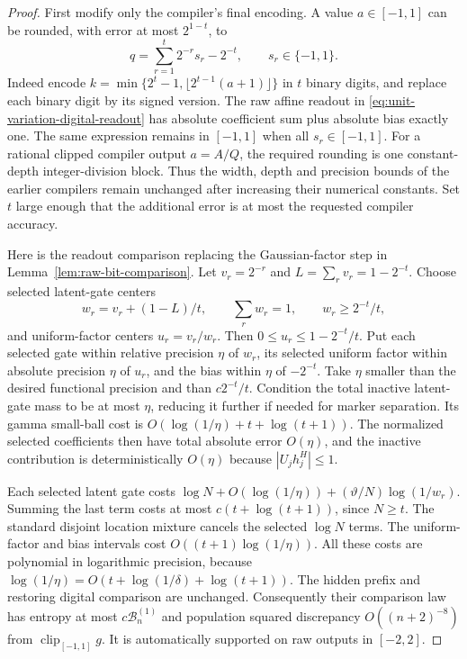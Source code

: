 \begin{proof}
First modify only the compiler's final encoding.  A value $a\in[-1,1]$
can be rounded, with error at most $2^{1-t}$, to
\begin{equation}\label{eq:unit-variation-digital-readout}
 q=\sum_{r=1}^t2^{-r}s_r-2^{-t},\qquad s_r\in\{-1,1\}.
\end{equation}
Indeed encode
$k=\min\{2^t-1,\lfloor2^{t-1}(a+1)\rfloor\}$ in $t$ binary digits,
and replace each binary digit by its signed version.  The raw affine
readout in \eqref{eq:unit-variation-digital-readout} has absolute
coefficient sum plus absolute bias exactly one.  The same expression
remains in $[-1,1]$ when all $s_r\in[-1,1]$.
For a rational clipped compiler output $a=A/Q$, the required rounding is
one constant-depth integer-division block.  Thus the width, depth and
precision bounds of the earlier compilers remain unchanged after
increasing their numerical constants.  Set $t$ large enough that the
additional error is at most the requested compiler accuracy.

Here is the readout comparison replacing the Gaussian-factor step in
Lemma~\ref{lem:raw-bit-comparison}.  Let $v_r=2^{-r}$ and
$L=\sum_rv_r=1-2^{-t}$.  Choose selected latent-gate centers
\[
 w_r=v_r+(1-L)/t,\qquad
 \sum_rw_r=1,\qquad w_r\ge2^{-t}/t,
\]
and uniform-factor centers $u_r=v_r/w_r$.  Then
$0\le u_r\le1-2^{-t}/t$.  Put each selected gate within relative
precision $\eta$ of $w_r$, its selected uniform factor within absolute
precision $\eta$ of $u_r$, and the bias within $\eta$ of $-2^{-t}$.
Take $\eta$ smaller than the desired functional precision and than
$c2^{-t}/t$.  Condition the total inactive latent-gate mass to be at
most $\eta$, reducing it further if needed for marker separation.
Its gamma small-ball cost is $O(\log(1/\eta)+t+\log(t+1))$.
The normalized selected coefficients then have total absolute error
$O(\eta)$, and the inactive contribution is deterministically $O(\eta)$
because $|U_jh_j^H|\le1$.

Each selected latent gate costs $\log N+O(\log(1/\eta))+
(\vartheta/N)\log(1/w_r)$.  Summing the last term costs at most
$c(t+\log(t+1))$, since $N\ge t$.  The standard disjoint location
mixture cancels the selected $\log N$ terms.  The uniform-factor and
bias intervals cost $O((t+1)\log(1/\eta))$.  All these costs are
polynomial in logarithmic precision, because
$\log(1/\eta)=O(t+\log(1/\delta)+\log(t+1))$.
The hidden prefix and restoring digital comparison are unchanged.
Consequently their comparison law has entropy at most
$c\mathcal B_n^{(1)}$ and population squared discrepancy
$O((n+2)^{-8})$ from $\operatorname{clip}_{[-1,1]}g$.
It is automatically supported on raw outputs in $[-2,2]$.


\end{proof}

